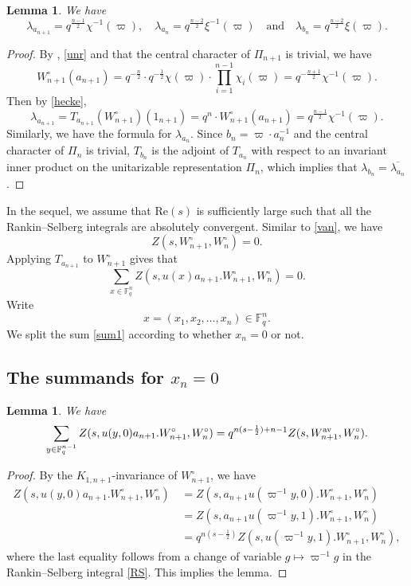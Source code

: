 \documentclass[11pt, a4paper]{amsart}
\renewcommand{\Re}{{\mathrm{Re}}}
\newcommand{\be}{\begin {equation}}
\newcommand{\ee}{\end {equation}}
\theoremstyle{plain}
\theoremstyle{plain}
\theoremstyle{plain}
\newtheorem{leml}[lem]{Lemma}
\theoremstyle{plain}
\theoremstyle{remark}
\theoremstyle{definition}
\theoremstyle{plain}
\numberwithin{equation}{section}
\begin{document}
\begin{leml} \label{lem:eigen}
We have 
\[
\lambda_{a_{n+1}} = q^{\frac{n-1}{2}} \chi^{-1}(\varpi), \quad \lambda_{a_n} = q^{\frac{n-2}{2}} \xi^{-1}(\varpi)\quad \text{and}\quad \lambda_{b_n} = q^{\frac{n-2}{2}} \xi(\varpi).
\]
\end{leml}

\begin{proof}
By \cite[Theorem 3.1]{Matringe}, \eqref{unr} and that the central character of  $\Pi_{n+1}$ is trivial, we have 
\[
W_{n+1}^\circ(a_{n+1}) = q^{-\frac{n}{2}} \cdot q^{-\frac{1}{2}}\chi(\varpi) \cdot \prod^{n-1}_{i=1}\chi_i(\varpi) = q^{-\frac{n+1}{2}}\chi^{-1}(\varpi). 
\]
Then by \eqref{hecke}, 
\[
\lambda_{a_{n+1}} =T_{a_{n+1}}(W_{n+1}^\circ)(1_{n+1}) =  q^n \cdot W^\circ_{n+1}(a_{n+1}) = q^{\frac{n-1}{2}}\chi^{-1}(\varpi). 
\]
Similarly, we have the formula for $\lambda_{a_n}$. Since $b_n = \varpi\cdot a_n^{-1}$ and the central character of $\Pi_n$ is trivial, $T_{b_n}$ is the adjoint of $T_{a_n}$ with respect to an invariant inner product on the unitarizable representation $\Pi_n$, which implies that $\lambda_{b_n} = \overline{\lambda_{a_n}}$. 
\end{proof}

In the sequel, we assume that $\Re(s)$ is sufficiently large such that all the Rankin--Selberg integrals are absolutely convergent. Similar to \eqref{van}, we have 
\[
Z(s, W_{n+1}^\circ, W_n^\circ) = 0. 
\]
Applying $T_{a_{n+1}}$ to $W_{n+1}^\circ$ gives that 
\be \label{sum1}
\sum_{x\in \mathbb{F}_q^n} Z(s, u(x)a_{n+1}. W_{n+1}^\circ, W_n^\circ) =0.
\ee
Write 
\[
x=(x_1,x_2,\ldots, x_n)\in \mathbb{F}_q^n.
\]
We split the sum \eqref{sum1} according to 
whether $x_n=0$ or not. 

\subsection{The summands for $x_n=0$}

\begin{leml} \label{xn=0}
We have 
\[
\sum_{y\in \mathbb{F}_q^{n-1}}Z(s, u(y,0)a_{n+1}. W_{n+1}^\circ, W_n^\circ) = q^{n(s-\frac{1}{2})+n-1} Z(s, W_{n+1}^{\rm av}, W_n^\circ). 
\]
\end{leml}

\begin{proof}
By the $K_{1,n+1}$-invariance of $W_{n+1}^\circ$, we have
\[
\begin{aligned}
Z(s, u(y,0)a_{n+1}. W_{n+1}^\circ, W_n^\circ)\, & = Z(s,  a_{n+1} u(\varpi^{-1}y, 0). W_{n+1}^\circ, W_n^\circ)  \\
& = Z(s,  a_{n+1} u(\varpi^{-1}y, 1). W_{n+1}^\circ, W_n^\circ)  \\
& = q^{n(s-\frac{1}{2})} Z(s,   u(\varpi^{-1}y, 1). W_{n+1}^\circ, W_n^\circ),
\end{aligned}
\]
where the last equality follows from a change of variable $g\mapsto \varpi^{-1} g$ in the Rankin--Selberg integral \eqref{RS}. This implies the lemma.
\end{proof}
\end{document}
